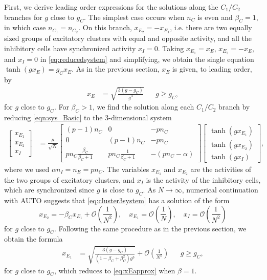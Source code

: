 \documentclass[reqno]{siamonline190516}
\begin{document}
First, we derive leading order expressions for the solutions along the $C_1/C_2$ branches for $g$ close to $g_C$. The simplest case occurs when $n_C$ is even and $\beta_C = 1$, in which case $n_{C_1}=n_{C_2}$. On this branch, $x_{E_2} = -x_{E_1}$, i.e. there are two equally sized groups of excitatory clusters with equal and opposite activity, and all the inhibitory cells have synchronized activity $x_I = 0$. Taking $x_{E_1} = x_E$, $x_{E_2} = -x_E$, and $x_I = 0$ in \cref{eq:reducedsystem} and simplifying, we obtain the single equation $\tanh(g x_E) = g_C x_E$. As in the previous section, $x_E$ is given, to leading order, by
\begin{align}\label{eq:xEapprox}
x_E &= \sqrt{ \frac{3(g - g_C) }{g^3}} && g \geq g_C,
\end{align}
for $g$ close to $g_C$. For $\beta_C > 1$, we find the solution along each $C_1/C_2$ branch by reducing \cref{eqn:sys_Basic} to the 3-dimensional system
\begin{equation}\label{eq:cluster3system}
 \begin{aligned}
 \begin{bmatrix} x_{E_1} \\ x_{E_2} \\ x_{I} \end{bmatrix} 
 &= \frac{\mu}{\sqrt{N}} 
 \begin{bmatrix} 
    (p-1)n_C & 0 & -p n_C  \\
    0  & (p-1)n_C & -p n_C \\
    p n_C \frac{\beta_C}{\beta_C+1} &
    p n_C \frac{1}{\beta_C+1} &
    -(p n_C - \alpha)
 \end{bmatrix}
 \begin{bmatrix} \tanh(g x_{E_1}) \\\tanh ( g x_{E_2} ) \\\tanh(g x_{I})\end{bmatrix},
 \end{aligned}
 \end{equation}
 where we used $\alpha n_I = n_E = p n_C$. The variables $x_{E_1}$ and $x_{E_2}$ are the activities of the two groups of excitatory clusters, and $x_I$ is the activity of the inhibitory cells, which are synchronized since $g$ is close to $g_C$. As $N \rightarrow \infty$, numerical continuation with AUTO suggests that \cref{eq:cluster3system} has a solution of the form
\begin{equation}\label{eq:XE1E2asymp}
    x_{E_2} = -\beta_C x_{E_1} + \mathcal{O}\left( \frac{1}{N^2} \right), \quad 
    x_{E_1} = \mathcal{O}\left( \frac{1}{N} \right), \quad
    x_I = \mathcal{O}\left( \frac{1}{N^2} \right)
\end{equation}
for $g$ close to $g_C$. Following the same procedure as in the previous section, we obtain the formula
 \begin{align}\label{eq:XE1}
 x_{E_1} &= \sqrt{ \frac{ 3(g - g_C) }{ (1 - \beta_C + \beta_C^2 )g^3}} + \mathcal{O}\left( \frac{1}{N^2}\right)&& g \geq g_C,
\end{align}
for $g$ close to $g_C$, which reduces to \cref{eq:xEapprox} when $\beta = 1$.
\end{document}
